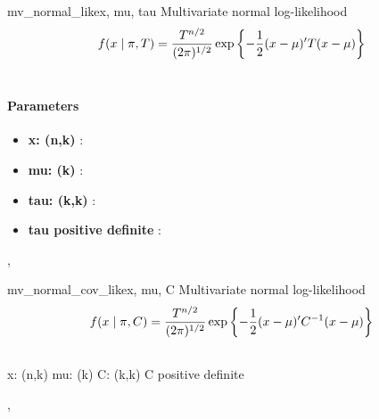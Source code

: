 \hypertarget{pymc.distributions.mv_normal_like}{}\begin{funcdesc}{mv\_normal\_like}{x, mu, tau}
Multivariate normal log-likelihood
\begin{gather}
\begin{split}f(x \mid \pi, T) = \frac{T^{n/2}}{(2\pi)^{1/2}} \exp\left\{ -\frac{1}{2} (x-\mu)^{\prime}T(x-\mu) \right\}\end{split}\notag\\\begin{split}\end{split}\notag
\end{gather}\paragraph{Parameters}\begin{itemize}

\item[] \textbf{x: (n,k)} :

\item[] \textbf{mu: (k)} :

\item[] \textbf{tau: (k,k)} :

\item[] \textbf{tau positive definite} :
\end{itemize}



\hyperlink{pymc.distributions.mv_normal_chol_like}{}, \hyperlink{pymc.distributions.mv_normal_cov_like}{}


\end{funcdesc}

\hypertarget{pymc.distributions.mv_normal_cov_like}{}\begin{funcdesc}{mv\_normal\_cov\_like}{x, mu, C}
Multivariate normal log-likelihood
\begin{gather}
\begin{split}f(x \mid \pi, C) = \frac{T^{n/2}}{(2\pi)^{1/2}} \exp\left\{ -\frac{1}{2} (x-\mu)^{\prime}C^{-1}(x-\mu) \right\}\end{split}\notag\\\begin{split}\end{split}\notag
\end{gather}
x: (n,k)
mu: (k)
C: (k,k)
C positive definite




\hyperlink{pymc.distributions.mv_normal_like}{}, \hyperlink{pymc.distributions.mv_normal_chol_like}{}


\end{funcdesc}

